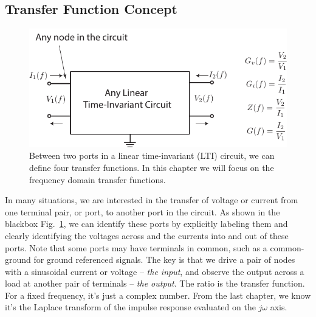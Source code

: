 \subsection{Transfer Function Concept}
\begin{figure}[tb]
\centering
\includegraphics[scale=1]{transfer_func}
\caption{Between two ports in a linear time-invariant (LTI) circuit, we can define four transfer functions.  In this chapter we will focus on the frequency domain transfer functions.}
\label{fig:blackboxltiports}
\end{figure}
In many situations, we are interested in the transfer of voltage or current from one terminal pair, or port, to another port in the circuit.  As shown in the blackbox Fig.~\ref{fig:blackboxltiports}, we can identify these ports by explicitly labeling them and clearly identifying the voltages across and the currents into and out of these ports.  Note that some ports may have terminals in common, such as a common-ground for ground referenced signals.  
The key is that we drive a pair of nodes with a sinusoidal current or voltage -- \textit{the input}, and observe the output across a load at another pair of terminals -- \textit{the output}.  The ratio is the transfer function.  For a fixed frequency, it’s just a complex number.  From the last chapter, we know it's the  Laplace transform of the impulse response evaluated on the $j\omega$ axis.

